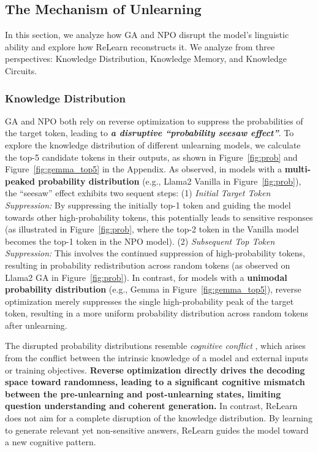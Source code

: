 \subsection{The Mechanism of Unlearning}
In this section, we analyze how GA and NPO disrupt the model's linguistic ability and explore how ReLearn reconstructs it.
We analyze from three perspectives: Knowledge Distribution, Knowledge Memory, and Knowledge Circuits.

\subsubsection{Knowledge Distribution}
GA and NPO both rely on reverse optimization to suppress the probabilities of the target token, leading to \textbf{\textit{a disruptive ``probability seesaw effect''}}. 
To explore the knowledge distribution of different unlearning models, we calculate the top-5 candidate tokens in their outputs, as shown in Figure~\ref{fig:prob} and Figure~\ref{fig:gemma_top5} in the Appendix. 
As observed, in models with a \textbf{multi-peaked probability distribution} (e.g., Llama2 Vanilla in Figure~\ref{fig:prob}), the ``seesaw'' effect exhibits two sequent steps: 
(1) \emph{Initial Target Token Suppression:} By suppressing the initially top-1 token and guiding the model towards other high-probability tokens, this potentially leads to sensitive responses (as illustrated in Figure~\ref{fig:prob}, where the top-2 token in the Vanilla model becomes the top-1 token in the NPO model).
(2) \emph{Subsequent Top Token Suppression:} This involves the continued suppression of high-probability tokens, resulting in probability redistribution across random tokens (as observed on Llama2 GA in Figure~\ref{fig:prob}).  
In contrast, for models with a \textbf{unimodal probability distribution} (e.g., Gemma in Figure~\ref{fig:gemma_top5}), reverse optimization merely suppresses the single high-probability peak of the target token, resulting in a more uniform probability distribution across random tokens after unlearning. 

The disrupted probability distributions resemble \emph{cognitive conflict} \citep{xu-etal-2024-earth}, which arises from the conflict between the intrinsic knowledge of a model and external inputs or training objectives.  
\textbf{Reverse optimization directly drives the decoding space toward randomness, leading to a significant cognitive mismatch between the pre-unlearning and post-unlearning states, limiting question understanding and coherent generation.}  
In contrast, ReLearn does not aim for a complete disruption of the knowledge distribution.  
By learning to generate relevant yet non-sensitive answers, ReLearn guides the model toward a new cognitive pattern.

